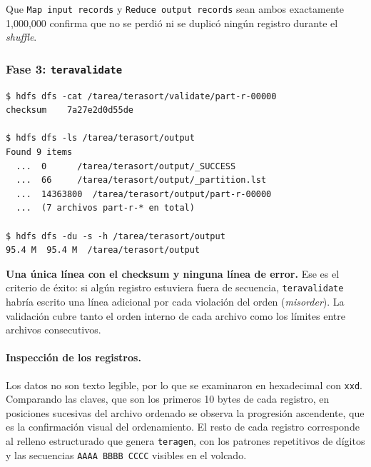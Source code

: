 Que \texttt{Map input records} y \texttt{Reduce output records} sean ambos exactamente 1,000,000 confirma que no se perdió ni se duplicó ningún registro durante el \textit{shuffle}.


\subsubsection{Fase 3: \texttt{teravalidate}}

\begin{lstlisting}[style=sh]
$ hdfs dfs -cat /tarea/terasort/validate/part-r-00000
checksum    7a27e2d0d55de

$ hdfs dfs -ls /tarea/terasort/output
Found 9 items
  ...  0      /tarea/terasort/output/_SUCCESS
  ...  66     /tarea/terasort/output/_partition.lst
  ...  14363800  /tarea/terasort/output/part-r-00000
  ...  (7 archivos part-r-* en total)

$ hdfs dfs -du -s -h /tarea/terasort/output
95.4 M  95.4 M  /tarea/terasort/output
\end{lstlisting}

\textbf{Una única línea con el checksum y ninguna línea de error.} Ese es el criterio de éxito: si algún registro estuviera fuera de secuencia, \texttt{teravalidate} habría escrito una línea adicional por cada violación del orden (\textit{misorder}). La validación cubre tanto el orden interno de cada archivo como los límites entre archivos consecutivos.


\paragraph{Inspección de los registros.} Los datos no son texto legible, por lo que se examinaron en hexadecimal con \texttt{xxd}. Comparando las claves, que son los primeros 10 bytes de cada registro, en posiciones sucesivas del archivo ordenado se observa la progresión ascendente, que es la confirmación visual del ordenamiento. El resto de cada registro corresponde al relleno estructurado que genera \texttt{teragen}, con los patrones repetitivos de dígitos y las secuencias \texttt{AAAA BBBB CCCC} visibles en el volcado.

